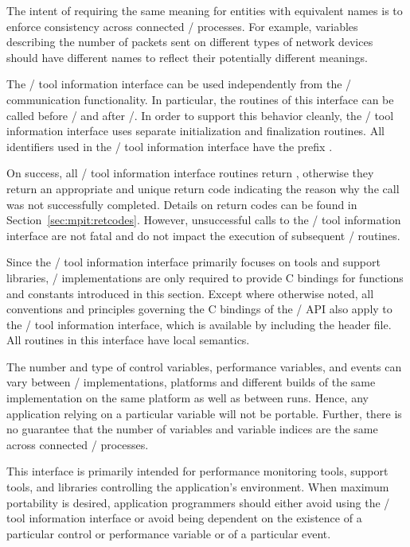 \begin{rationale}
The intent of requiring the same meaning for entities with equivalent names
is to enforce consistency across connected \MPI/ processes.  For example,
variables describing the number of packets sent on different types of
network devices should have different names to reflect their potentially
different meanings.
\end{rationale}

The \MPI/ tool information interface can be used independently from the
\MPI/ communication functionality.  In particular, the routines of this
interface can be called before \MPIisinitialized/ and
after \MPIisfinalized/.  In order to support this behavior cleanly,
the \MPI/ tool information interface uses separate initialization and
finalization routines.  All identifiers used in the \MPI/ tool information
interface have the prefix .

On success, all \MPI/ tool information interface routines return
, otherwise they return an appropriate and unique
return code indicating the reason why the call was not successfully
completed.  Details on return codes can be found in
Section~\ref{sec:mpit:retcodes}.  However, unsuccessful calls to the \MPI/
tool information interface are not fatal and do not impact the execution of
subsequent \MPI/ routines.

Since the \MPI/ tool information interface primarily focuses on tools and
support libraries, \MPI/ implementations are only required to provide C
bindings for functions and constants introduced in this section.  Except
where otherwise noted, all conventions and principles governing the C
bindings of the \MPI/ API also apply to the \MPI/ tool information
interface, which is available by including the  header file.
All routines in this interface have local semantics.

\begin{users}
The number and type of control variables, performance variables, and events can vary
between \MPI/ implementations, platforms and different builds of the same
implementation on the same platform as well as between runs.  Hence, any
application relying on a particular variable will not be portable.
Further, there is no guarantee that the number of variables and variable
indices are the same across connected \MPI/ processes.

This interface is primarily intended for performance monitoring tools,
support tools, and libraries controlling the application's environment.
When maximum portability is desired, application programmers should either
avoid using the \MPI/ tool information interface or avoid being dependent
on the existence of a particular control or performance variable or of a
particular event.
\end{users}



